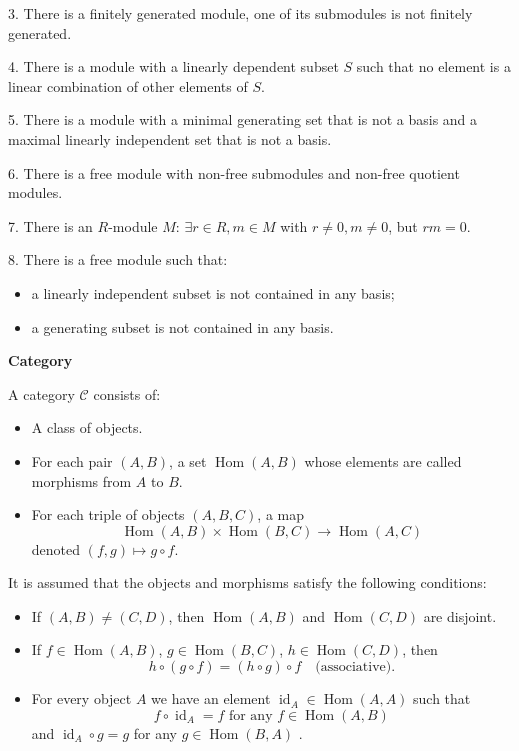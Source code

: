 \documentclass[11pt, a4paper]{report}
\begin{document}
3. There is a finitely generated module, one of its submodules is not finitely generated.

4. There is a module with a linearly dependent subset $S$ such that no element is a linear combination of other elements of $S$.

5. There is a module with a minimal generating set that is not a basis and a maximal linearly independent set that is not a basis.

6. There is a free module with non-free submodules and non-free quotient modules.

7. There is an $R$-module $M$: $\exists r \in R, m \in M$ with $r \neq 0, m \neq 0$, but $rm = 0$.

8. There is a free module such that:
\begin{itemize}
\item a linearly independent subset is not contained in any basis;
\item a generating subset is not contained in any basis.
\end{itemize}

\begin{definition}
\textbf{Category}

A category $\mathcal{C}$ consists of:
\begin{itemize}
\item A class of objects.
\item For each pair $(A, B)$, a set $\operatorname{Hom}(A, B)$ whose elements are called morphisms from $A$ to $B$.
\item For each triple of objects $(A, B, C)$, a map
\[
\operatorname{Hom}(A, B) \times \operatorname{Hom}(B, C) \rightarrow \operatorname{Hom}(A, C)
\]
denoted $(f, g) \mapsto g \circ f$.
\end{itemize}

It is assumed that the objects and morphisms satisfy the following conditions:
\begin{itemize}
\item If $(A, B) \neq (C, D)$, then $\operatorname{Hom}(A, B)$ and $\operatorname{Hom}(C, D)$ are disjoint.
\item If $f \in \operatorname{Hom}(A, B)$, $g \in \operatorname{Hom}(B, C)$, $h \in \operatorname{Hom}(C, D)$, then
\[
h \circ (g \circ f) = (h \circ g) \circ f \quad \text{(associative)}.
\]
\item For every object $A$ we have an element $\operatorname{id}_A \in \operatorname{Hom}(A, A)$ such that
\[
f \circ \operatorname{id}_A = f \text{ for any } f \in \operatorname{Hom}(A, B)
\]
and $\operatorname{id}_A \circ g = g$ for any $g \in \operatorname{Hom}(B, A)$ .
\end{itemize}
\end{definition}
\end{document}
